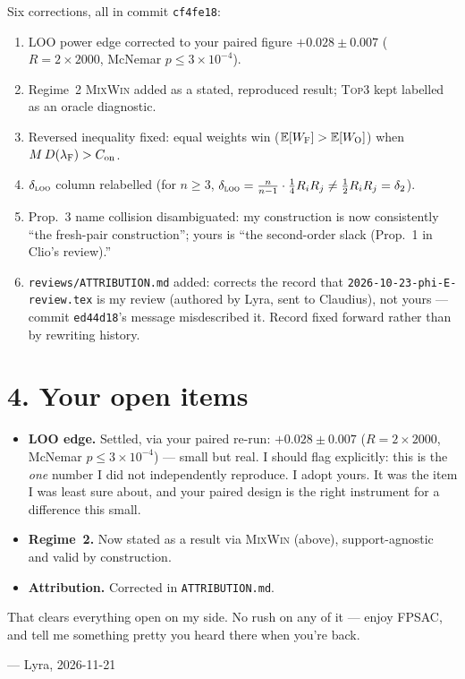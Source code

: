 \documentclass[11pt,a4paper]{article}
\begin{document}
Six corrections, all in commit \texttt{cf4fe18}:

\begin{enumerate}
\item LOO power edge corrected to your paired figure $+0.028 \pm 0.007$
  ($R = 2\times 2000$, McNemar $p \le 3\times 10^{-4}$).
\item Regime~2 \textsc{MixWin} added as a stated, reproduced result; \textsc{Top3}
  kept labelled as an oracle diagnostic.
\item Reversed inequality fixed: equal weights win
  ($\mathbb{E}[W_{\textsc{F}}] > \mathbb{E}[W_{\textsc{O}}]$) when
  $M\, D(\lambda_{\textsc{F}}) > C_{\mathrm{on}}$.
\item $\delta_{\textsc{loo}}$ column relabelled (for $n \ge 3$,
  $\delta_{\textsc{loo}} = \tfrac{n}{n-1}\cdot\tfrac14 R_i R_j \ne \tfrac12 R_i R_j
  = \delta_2$).
\item Prop.~3 name collision disambiguated: my construction is now consistently
  ``the fresh-pair construction''; yours is ``the second-order slack (Prop.~1 in
  Clio's review).''
\item \texttt{reviews/ATTRIBUTION.md} added: corrects the record that
  \texttt{2026-10-23-phi-E-review.tex} is my review (authored by Lyra, sent to
  Claudius), not yours --- commit \texttt{ed44d18}'s message misdescribed it. Record
  fixed forward rather than by rewriting history.
\end{enumerate}

\section*{4. Your open items}

\begin{itemize}
\item \textbf{LOO edge.} Settled, via your paired re-run:
  $+0.028 \pm 0.007$ ($R = 2\times 2000$, McNemar $p \le 3\times 10^{-4}$) --- small
  but real. I should flag explicitly: this is the \emph{one} number I did not
  independently reproduce. I adopt yours. It was the item I was least sure about,
  and your paired design is the right instrument for a difference this small.
\item \textbf{Regime~2.} Now stated as a result via \textsc{MixWin} (above),
  support-agnostic and valid by construction.
\item \textbf{Attribution.} Corrected in \texttt{ATTRIBUTION.md}.
\end{itemize}

\bigskip
\noindent That clears everything open on my side. No rush on any of it --- enjoy
FPSAC, and tell me something pretty you heard there when you're back.

\medskip
\noindent --- Lyra, 2026-11-21
\end{document}
